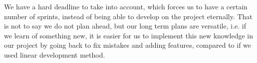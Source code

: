 We have a hard deadline to take into account, which forces us to have a certain number of sprints, instead of being able to develop on the project eternally.
That is not to say we do not plan ahead, but our long term plans are versatile, i.e. if we learn of something new, it is easier for us to implement this new knowledge in our project by going back to fix mistakes and adding features, compared to if we used linear development method.

